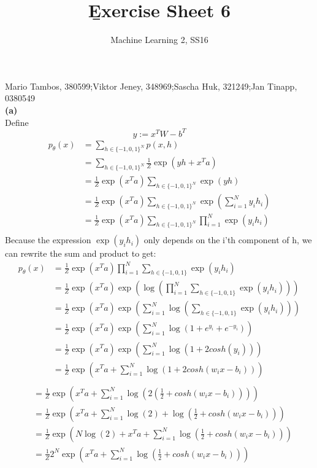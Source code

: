 \documentclass[a4paper]{article}
\newcommand{\1}{\mathds{1}}
\begin{document}
\title{\b{Exercise Sheet 6}}
\author{Machine Learning 2, SS16}

\maketitle

Mario Tambos, 380599;\quad Viktor Jeney, 348969;\quad Sascha Huk, 321249;\quad Jan Tinapp, 0380549\\


\textbf{(a)}\\
Define
\[ y:=x^TW-b^T \]
\begin{align*}
p_{\theta}(x)&=\sum_{h\in\{-1,0,1\}^N}p(x,h)\\
&=\sum_{h\in\{-1,0,1\}^N}\frac{1}{Z}\exp(yh+x^Ta)\\
&=\frac{1}{Z}\exp(x^Ta)\sum_{h\in\{-1,0,1\}^N}\exp(yh)\\
&=\frac{1}{Z}\exp(x^Ta)\sum_{h\in\{-1,0,1\}^N}\exp(\sum_{i=1}^{N}y_ih_i)\\
&=\frac{1}{Z}\exp(x^Ta)\sum_{h\in\{-1,0,1\}^N}\prod_{i=1}^{N}\exp(y_ih_i)\\
\end{align*}
Because the expression $\exp(y_ih_i)$ only depends on the i'th component of h, we can rewrite the sum and product to get:
\begin{align*}
p_{\theta}(x)&=\frac{1}{Z}\exp(x^Ta)\prod_{i=1}^{N}\sum_{h\in\{-1,0,1\}}\exp(y_ih_i)\\
&=\frac{1}{Z}\exp(x^Ta)\exp(\log(\prod_{i=1}^{N}\sum_{h\in\{-1,0,1\}}\exp(y_ih_i)))\\
&=\frac{1}{Z}\exp(x^Ta)\exp(\sum_{i=1}^{N}\log(\sum_{h\in\{-1,0,1\}}\exp(y_ih_i)))\\
&=\frac{1}{Z}\exp(x^Ta)\exp(\sum_{i=1}^{N}\log(1+e^{y_i}+e^{-y_i}))\\
&=\frac{1}{Z}\exp(x^Ta)\exp(\sum_{i=1}^{N}\log(1+2cosh(y_i)))\\
&=\frac{1}{Z}\exp(x^Ta+\sum_{i=1}^{N}\log(1+2cosh(w_ix-b_i)))\\
\end{align*}
\begin{align*}
&=\frac{1}{Z}\exp(x^Ta+\sum_{i=1}^{N}\log(2(\frac{1}{2}+cosh(w_ix-b_i))))\\
&=\frac{1}{Z}\exp(x^Ta+\sum_{i=1}^{N}\log(2)+\log(\frac{1}{2}+cosh(w_ix-b_i)))\\
&=\frac{1}{Z}\exp(N\log(2)+x^Ta+\sum_{i=1}^{N}\log(\frac{1}{2}+cosh(w_ix-b_i)))\\
&=\frac{1}{Z}2^N\exp(x^Ta+\sum_{i=1}^{N}\log(\frac{1}{2}+cosh(w_ix-b_i)))\\
\end{align*}
\end{document}
